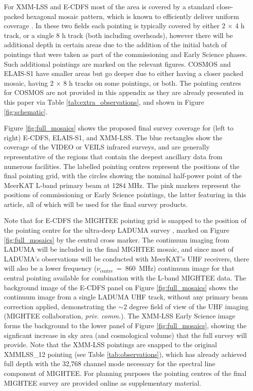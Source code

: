 \documentclass[usenatbib,usedcolumn]{mnras}
\begin{document}
For XMM-LSS and E-CDFS most of the area is covered by a standard close-packed hexagonal mosaic pattern, which is known to efficiently deliver uniform coverage \citep[e.g.][]{condon1998}. In these two fields each pointing is typically covered by either 2 $\times$ 4 h track, or a single 8 h track (both including overheads), however there will be additional depth in certain areas due to the addition of the initial batch of pointings that were taken as part of the commissioning and Early Science phases. Such additional pointings are marked on the relevant figures. COSMOS and ELAIS-S1 have smaller areas but go deeper due to either having a closer packed mosaic, having 2 $\times$ 8 h tracks on some pointings, or both. The pointing centres for COSMOS are not provided in this appendix as they are already presented in this paper via Table \ref{tab:extra_observations}, and shown in Figure \ref{fig:schematic}.

Figure \ref{fig:full_mosaics} shows the proposed final survey coverage for (left to right) E-CDFS, ELAIS-S1, and XMM-LSS. The blue rectangles show the coverage of the VIDEO \citep{jarvis2013} or VEILS \citep{honig2017} infrared surveys, and are generally representative of the regions that contain the deepest ancillary data from numerous facilities. The labelled pointing centres represent the positions of the final pointing grid, with the circles showing the nominal half-power point of the MeerKAT L-band primary beam at 1284 MHz. The pink markers represent the positions of commissioning or Early Science pointings, the latter featuring in this article, all of which will be used for the final survey products.

Note that for E-CDFS the MIGHTEE pointing grid is snapped to the position of the pointing centre for the ultra-deep LADUMA survey \citep{baker2018}, marked on Figure \ref{fig:full_mosaics} by the central cross marker. The continuum imaging from LADUMA will be included in the final MIGHTEE mosaic, and since most of LADUMA's observations will be conducted with MeerKAT's UHF receivers, there will also be a lower frequency ($\nu_{\mathrm{centre}}$~=~860~MHz) continuum image for that central pointing available for combination with the L-band MIGHTEE data. The background image of the E-CDFS panel on Figure \ref{fig:full_mosaics} shows the continuum image from a single LADUMA UHF track, without any primary beam correction applied, demonstrating the $\sim$2 degree field of view of the UHF imaging (MIGHTEE collaboration, \emph{priv. comm.}). The XMM-LSS Early Science image forms the background to the lower panel of Figure \ref{fig:full_mosaics}, showing the signficant increase in sky area (and cosmological volume) that the full survey will provide. Note that the XMM-LSS pointings are snapped to the original XMMLSS\_12 pointing (see Table \ref{tab:observations}), which has already achieved full depth with the 32,768 channel mode necessary for the spectral line component of MIGHTEE. For planning purposes the pointing centres of the final MIGHTEE survey are provided online as supplementary material. 





\bsp	%
\label{lastpage}
\end{document}
